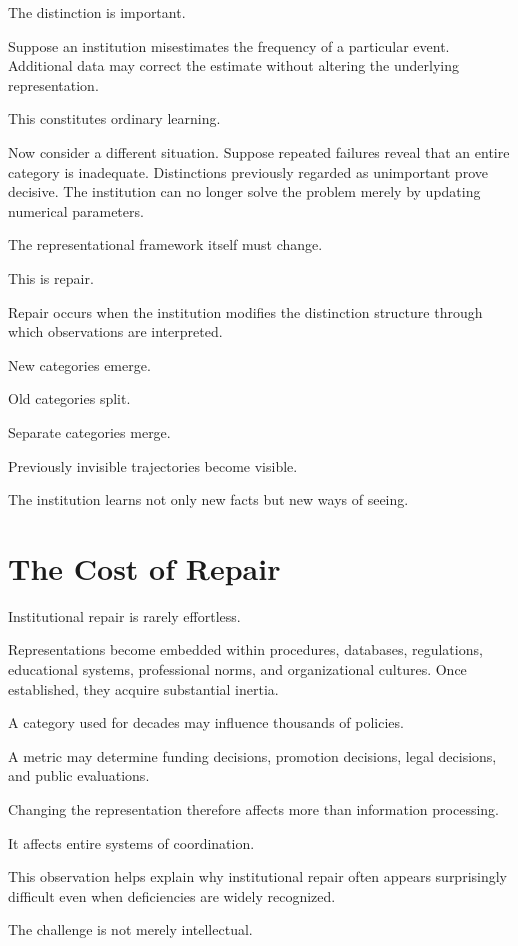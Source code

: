\documentclass[11pt,oneside,openany]{book}
\begin{document}
The distinction is important.

Suppose an institution misestimates the frequency of a particular event. Additional data may correct the estimate without altering the underlying representation.

This constitutes ordinary learning.

Now consider a different situation. Suppose repeated failures reveal that an entire category is inadequate. Distinctions previously regarded as unimportant prove decisive. The institution can no longer solve the problem merely by updating numerical parameters.

The representational framework itself must change.

This is repair.

Repair occurs when the institution modifies the distinction structure through which observations are interpreted.

New categories emerge.

Old categories split.

Separate categories merge.

Previously invisible trajectories become visible.

The institution learns not only new facts but new ways of seeing.

\section{The Cost of Repair}

Institutional repair is rarely effortless.

Representations become embedded within procedures, databases, regulations, educational systems, professional norms, and organizational cultures. Once established, they acquire substantial inertia.

A category used for decades may influence thousands of policies.

A metric may determine funding decisions, promotion decisions, legal decisions, and public evaluations.

Changing the representation therefore affects more than information processing.

It affects entire systems of coordination.

This observation helps explain why institutional repair often appears surprisingly difficult even when deficiencies are widely recognized.

The challenge is not merely intellectual.
\end{document}

